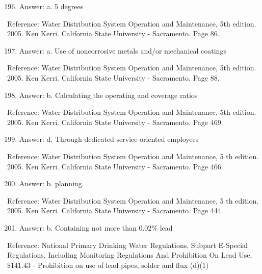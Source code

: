 \documentclass[10pt]{article}
\begin{document}
\begin{enumerate}
  \setcounter{enumi}{195}
  \item Answer: a. 5 degrees
\end{enumerate}

Reference: Water Distribution System Operation and Maintenance, 5th edition. 2005. Ken Kerri. California State University - Sacramento. Page 86.

\begin{enumerate}
  \setcounter{enumi}{196}
  \item Answer: a. Use of noncorrosive metals and/or mechanical coatings
\end{enumerate}

Reference: Water Distribution System Operation and Maintenance, 5th edition. 2005. Ken Kerri. California State University - Sacramento. Page 88.

\begin{enumerate}
  \setcounter{enumi}{197}
  \item Answer: b. Calculating the operating and coverage ratios
\end{enumerate}

Reference: Water Distribution System Operation and Maintenance, 5th edition. 2005. Ken Kerri. California State University - Sacramento. Page 469.

\begin{enumerate}
  \setcounter{enumi}{198}
  \item Answer: d. Through dedicated service-oriented employees
\end{enumerate}

Reference: Water Distribution System Operation and Maintenance, 5 th edition. 2005. Ken Kerri. California State University - Sacramento. Page 466.

\begin{enumerate}
  \setcounter{enumi}{199}
  \item Answer: b. planning.
\end{enumerate}

Reference: Water Distribution System Operation and Maintenance, 5 th edition. 2005. Ken Kerri. California State University - Sacramento. Page 444.

\begin{enumerate}
  \setcounter{enumi}{200}
  \item Answer: b. Containing not more than $0.02 \%$ lead
\end{enumerate}

Reference: National Primary Drinking Water Regulations, Subpart E-Special Regulations, Including Monitoring Regulations And Prohibition On Lead Use, $\$ 141.43$ - Prohibition on use of lead pipes, solder and flux (d)(1)
\end{document}
